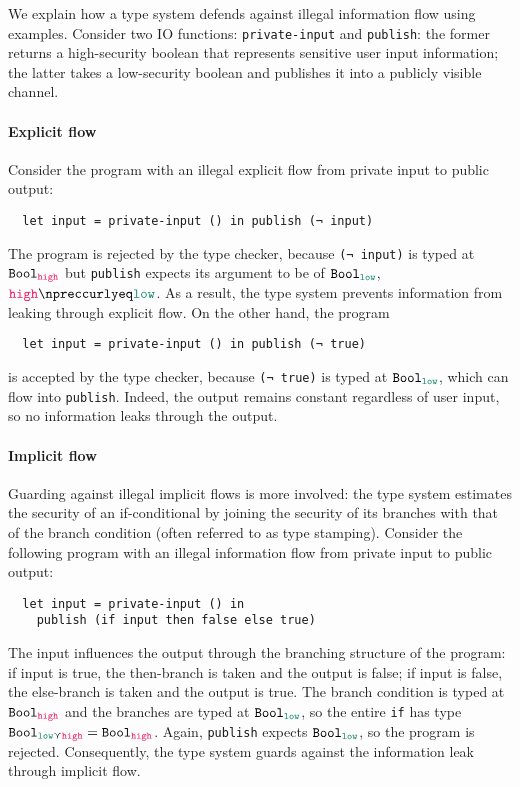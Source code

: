 \documentclass[10pt, letterpaper]{article}
\newcommand{\key}[1]{\ensuremath{\mathtt{#1}}}
\newcommand{\Bool}{\key{Bool}}
\newcommand{\high}{\textcolor{OrangeRed}{\key{high}}\xspace}
\newcommand{\low}{\textcolor{PineGreen}{\key{low}}\xspace}
\begin{document}
We explain how a type system defends against illegal information flow using
examples. Consider two IO functions: \texttt{private-input} and
\texttt{publish}: the former returns a high-security boolean that represents
sensitive user input information; the latter takes a low-security boolean and
publishes it into a publicly visible channel.

\paragraph{Explicit flow} Consider the program with an illegal explicit flow
from private input to public output:
\begin{verbatim}
  let input = private-input () in publish (¬ input)
\end{verbatim}
The program is rejected by the type checker, because \texttt{(¬ input)} is typed
at $\Bool_{\high}$ but \texttt{publish} expects its argument to be of
$\Bool_{\low}$, $\high \npreccurlyeq \low$. As a result, the type system
prevents information from leaking through explicit flow. On the other hand, the
program
\begin{verbatim}
  let input = private-input () in publish (¬ true)
\end{verbatim}
is accepted by the type checker, because \texttt{(¬ true)} is typed at
$\Bool_{\low}$, which can flow into \texttt{publish}. Indeed, the output remains
constant regardless of user input, so no information leaks through the output.

\paragraph{Implicit flow} Guarding against illegal implicit flows is
more involved: the type system estimates the security of an if-conditional by
joining the security of its branches with that of the branch condition (often
referred to as type stamping). Consider the following program with an illegal
information flow from private input to public output:
\begin{verbatim}
  let input = private-input () in
    publish (if input then false else true)
\end{verbatim}
The input influences the output through the branching structure of the program:
if input is true, the then-branch is taken and the output is false; if input is
false, the else-branch is taken and the output is true. The branch condition is
typed at $\Bool_{\high}$ and the branches are typed at $\Bool_{\low}$, so the
entire \texttt{if} has type $\Bool_{\low \curlyvee \high} = \Bool_{\high}$.
Again, \texttt{publish} expects $\Bool_{\low}$, so the program is rejected.
Consequently, the type system guards against the information leak through
implicit flow.
\end{document}
